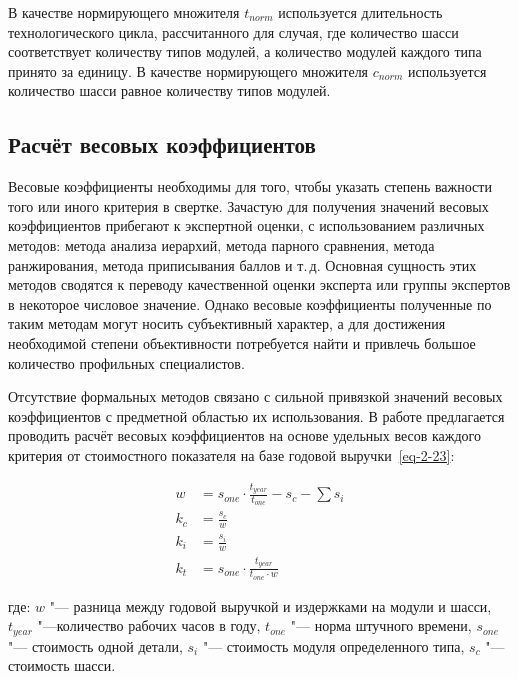 В качестве нормирующего множителя $t_{norm}$ используется длительность технологического цикла, рассчитанного для случая, где количество шасси соответствует количеству типов модулей, а количество модулей каждого типа принято за единицу. В качестве нормирующего множителя $c_{norm}$ используется количество шасси равное количеству типов модулей.

\subsection{Расчёт весовых коэффициентов}

Весовые коэффициенты необходимы для того, чтобы указать степень важности того или иного критерия в свертке. Зачастую для получения значений весовых коэффициентов прибегают к экспертной оценки, с использованием различных методов: метода анализа иерархий, метода парного сравнения, метода ранжирования, метода приписывания баллов и т.\,д. Основная сущность этих методов сводятся к переводу качественной оценки эксперта или группы экспертов в некоторое числовое значение.  Однако весовые коэффициенты полученные по таким методам могут носить субъективный характер, а для достижения необходимой степени объективности потребуется найти и привлечь большое количество профильных специалистов.

Отсутствие формальных методов связано с сильной привязкой значений весовых коэффициентов с предметной областью их использования. В работе предлагается проводить расчёт весовых коэффициентов на основе удельных весов каждого критерия от стоимостного показателя на базе годовой выручки~\cref{eq-2-23}:

\begin{equation}
\begin{split}
	w   &= s_{one} \cdot \frac{t_{year}}{t_{one}} - s_c - \sum s_i \\
	k_c &= \frac{s_c}{w} \\
	k_i &= \frac{s_i}{w} \\
	k_t &= s_{one} \cdot \frac{t_{year}}{t_{one} \cdot w}
\end{split}
\label{eq-2-23}
\end{equation}

\noindent где:
\noindent $w$ "--- разница между годовой выручкой и издержками на модули и шасси,
\noindent $t_{year}$ "---количество рабочих часов в году,
\noindent $t_{one}$ "--- норма штучного времени,
\noindent $s_{one}$ "--- стоимость одной детали,
\noindent $s_i$ "--- стоимость модуля определенного типа,
\noindent $s_c$ "--- стоимость шасси.

